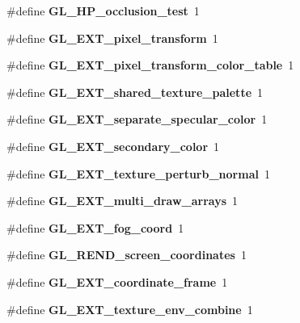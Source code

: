 \begin{DoxyCompactItemize}
\item 
\#define {\bfseries G\+L\+\_\+\+H\+P\+\_\+occlusion\+\_\+test}~1\label{_s_d_l__opengl_8h_a2935e70c3a4d6b3021b8fa7e916b98c8}

\item 
\#define {\bfseries G\+L\+\_\+\+E\+X\+T\+\_\+pixel\+\_\+transform}~1\label{_s_d_l__opengl_8h_a5bcff34dc0cd476cc470dc2db6fce74e}

\item 
\#define {\bfseries G\+L\+\_\+\+E\+X\+T\+\_\+pixel\+\_\+transform\+\_\+color\+\_\+table}~1\label{_s_d_l__opengl_8h_a195d46f259509ca95db1c820cafb798a}

\item 
\#define {\bfseries G\+L\+\_\+\+E\+X\+T\+\_\+shared\+\_\+texture\+\_\+palette}~1\label{_s_d_l__opengl_8h_aed74a7fa1af791e6842a75c5c2ed31ae}

\item 
\#define {\bfseries G\+L\+\_\+\+E\+X\+T\+\_\+separate\+\_\+specular\+\_\+color}~1\label{_s_d_l__opengl_8h_af1416eaaf89c3be86f19286a098ea52a}

\item 
\#define {\bfseries G\+L\+\_\+\+E\+X\+T\+\_\+secondary\+\_\+color}~1\label{_s_d_l__opengl_8h_a959e378b69a7528e9cdf7649231b54d6}

\item 
\#define {\bfseries G\+L\+\_\+\+E\+X\+T\+\_\+texture\+\_\+perturb\+\_\+normal}~1\label{_s_d_l__opengl_8h_af682c5cf3536fbaae0348ef29a27b819}

\item 
\#define {\bfseries G\+L\+\_\+\+E\+X\+T\+\_\+multi\+\_\+draw\+\_\+arrays}~1\label{_s_d_l__opengl_8h_ac37848bac8f6b202d656de5ac7d0d915}

\item 
\#define {\bfseries G\+L\+\_\+\+E\+X\+T\+\_\+fog\+\_\+coord}~1\label{_s_d_l__opengl_8h_aa97b9520d532d1fcc7018d7c9acf82f2}

\item 
\#define {\bfseries G\+L\+\_\+\+R\+E\+N\+D\+\_\+screen\+\_\+coordinates}~1\label{_s_d_l__opengl_8h_a5ba573d2cf1db3e6616cf09754704ff8}

\item 
\#define {\bfseries G\+L\+\_\+\+E\+X\+T\+\_\+coordinate\+\_\+frame}~1\label{_s_d_l__opengl_8h_a9d844e0d7d69b473c96f03312ef40cd2}

\item 
\#define {\bfseries G\+L\+\_\+\+E\+X\+T\+\_\+texture\+\_\+env\+\_\+combine}~1\label{_s_d_l__opengl_8h_a32ce1e4f21a95ea92694b4285706be96}


\end{DoxyCompactItemize}
